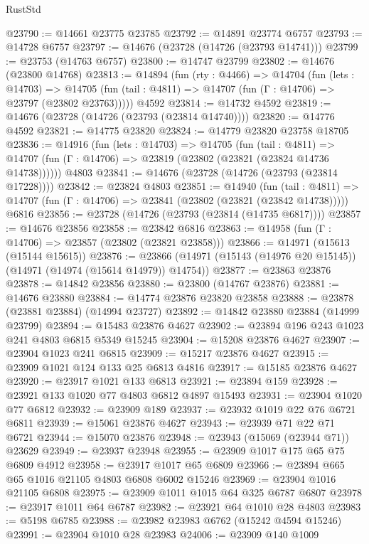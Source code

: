 \begin{lexlean}{RustStd}
\begin{coremodule}
@23790 := @14661 @23775 @23785
@23792 := @14891 @23774 @6757
@23793 := @14728 @6757
@23797 := @14676 (@23728 (@14726 (@23793 @14741)))
@23799 := @23753 (@14763 @6757)
@23800 := @14747 @23799
@23802 := @14676 (@23800 @14768)
@23813 := @14894
    (fun (rty : @4466) =>
    @14704
      (fun (lets : @14703) =>
      @14705 (fun (tail : @4811) => @14707 (fun (Γ : @14706) => @23797 (@23802 @23763)))))
    @4592
@23814 := @14732 @4592
@23819 := @14676 (@23728 (@14726 (@23793 (@23814 @14740))))
@23820 := @14776 @4592
@23821 := @14775 @23820
@23824 := @14779 @23820 @23758 @18705
@23836 := @14916
    (fun (lets : @14703) =>
    @14705
      (fun (tail : @4811) =>
      @14707 (fun (Γ : @14706) => @23819 (@23802 (@23821 (@23824 @14736 @14738))))))
    @4803
@23841 := @14676 (@23728 (@14726 (@23793 (@23814 @17228))))
@23842 := @23824 @4803
@23851 := @14940
    (fun (tail : @4811) => @14707 (fun (Γ : @14706) => @23841 (@23802 (@23821 (@23842 @14738)))))
    @6816
@23856 := @23728 (@14726 (@23793 (@23814 (@14735 @6817))))
@23857 := @14676 @23856
@23858 := @23842 @6816
@23863 := @14958 (fun (Γ : @14706) => @23857 (@23802 (@23821 @23858)))
@23866 := @14971 (@15613 (@15144 @15615))
@23876 := @23866 (@14971 (@15143 (@14976 @20 @15145)) (@14971 (@14974 (@15614 @14979)) @14754))
@23877 := @23863 @23876
@23878 := @14842 @23856
@23880 := @23800 (@14767 @23876)
@23881 := @14676 @23880
@23884 := @14774 @23876 @23820 @23858
@23888 := @23878 (@23881 @23884) (@14994 @23727)
@23892 := @14842 @23880 @23884 (@14999 @23799)
@23894 := @15483 @23876 @4627
@23902 := @23894 @196 @243 @1023 @241 @4803 @6815 @5349 @15245
@23904 := @15208 @23876 @4627
@23907 := @23904 @1023 @241 @6815
@23909 := @15217 @23876 @4627
@23915 := @23909 @1021 @124 @133 @25 @6813 @4816
@23917 := @15185 @23876 @4627
@23920 := @23917 @1021 @133 @6813
@23921 := @23894 @159
@23928 := @23921 @133 @1020 @77 @4803 @6812 @4897 @15493
@23931 := @23904 @1020 @77 @6812
@23932 := @23909 @189
@23937 := @23932 @1019 @22 @76 @6721 @6811
@23939 := @15061 @23876 @4627
@23943 := @23939 @71 @22 @71 @6721
@23944 := @15070 @23876
@23948 := @23943 (@15069 (@23944 @71)) @23629
@23949 := @23937 @23948
@23955 := @23909 @1017 @175 @65 @75 @6809 @4912
@23958 := @23917 @1017 @65 @6809
@23966 := @23894 @665 @65 @1016 @21105 @4803 @6808 @6002 @15246
@23969 := @23904 @1016 @21105 @6808
@23975 := @23909 @1011 @1015 @64 @325 @6787 @6807
@23978 := @23917 @1011 @64 @6787
@23982 := @23921 @64 @1010 @28 @4803
@23983 := @5198 @6785
@23988 := @23982 @23983 @6762 (@15242 @4594 @15246)
@23991 := @23904 @1010 @28 @23983
@24006 := @23909
    @140
    @1009

\end{coremodule}
\end{lexlean}
